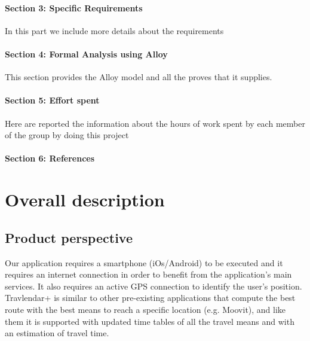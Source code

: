 \documentclass[12pt,titlepage]{article}
\begin{document}
\paragraph{Section 3: Specific Requirements}
In this part we include more details about the requirements 
\paragraph{Section 4: Formal Analysis using Alloy}
This section provides the Alloy model and all the proves that it supplies.
\paragraph{Section 5: Effort spent}
Here are reported the information about the hours of work spent by each member of the group by doing this project 
\paragraph{Section 6: References}
\pagebreak

\section{Overall description}\label{sec:crit}

\subsection{Product perspective}\label{sec:mod1}
Our application requires a smartphone (iOs/Android) to be executed and it requires an internet connection in order to benefit from the application's main services.
It also requires an active GPS connection to identify the user's position. 
Travlendar+ is similar to other pre-existing applications that compute the best route with the best means to reach a specific location (e.g. Moovit), and like them it is supported with updated time tables of all the travel means and with an estimation of travel time. 
\end{document}
